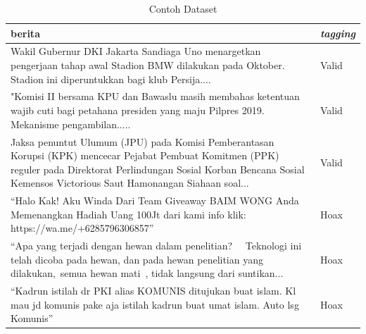\begin{table}
    \caption{Contoh Dataset}
    \label{tab:contoh_dataset}
    \centering
    \begin{tabular}{ | p{.8\linewidth} | l | }
        \hline
        \textbf{berita}                                                                                                                                                                                                                   & \textbf{\textit{tagging}} \\ \hline
        Wakil Gubernur DKI Jakarta Sandiaga Uno menargetkan pengerjaan tahap awal Stadion BMW dilakukan pada Oktober. Stadion ini diperuntukkan bagi klub Persija....                                                                     & Valid                     \\ \hline
        "Komisi II bersama KPU dan Bawaslu masih membahas ketentuan wajib cuti bagi petahana presiden yang maju Pilpres 2019. Mekanisme pengambilan.....                                                                                  & Valid                     \\ \hline
        Jaksa penuntut Ulumum (JPU) pada Komisi Pemberantasan Korupsi (KPK) mencecar Pejabat Pembuat Komitmen (PPK) reguler pada Direktorat Perlindungan Sosial Korban Bencana Sosial Kemensos Victorious Saut Hamonangan Siahaan soal... & Valid                     \\ \hline
        “Halo Kak! Aku Winda Dari Team Giveaway BAIM WONG Anda Memenangkan Hadiah Uang 100Jt dari kami info klik: https://wa.me/+6285796306857”                                                                                           & Hoax                      \\ \hline
        “Apa yang terjadi dengan hewan dalam penelitian?   Teknologi ini telah dicoba pada hewan, dan pada hewan penelitian yang dilakukan, semua hewan mati , tidak langsung dari suntikan...                                            & Hoax                      \\ \hline
        “Kadrun istilah dr PKI alias KOMUNIS ditujukan buat islam. Kl mau jd komunis pake aja istilah kadrun buat umat islam. Auto lsg Komunis”                                                                                           & Hoax                      \\ \hline
    \end{tabular}
\end{table}

